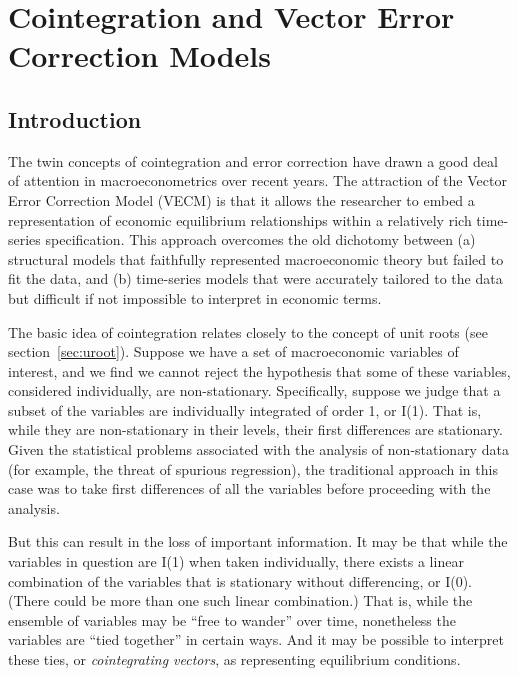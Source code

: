 \chapter{Cointegration and Vector Error Correction Models}
\label{chap:vecm}

\section{Introduction}
\label{sec:VECM-intro}

The twin concepts of cointegration and error correction have drawn a
good deal of attention in macroeconometrics over recent years.  The
attraction of the Vector Error Correction Model (VECM) is that it
allows the researcher to embed a representation of economic
equilibrium relationships within a relatively rich time-series
specification.  This approach overcomes the old dichotomy between (a)
structural models that faithfully represented macroeconomic theory but
failed to fit the data, and (b) time-series models that were
accurately tailored to the data but difficult if not impossible to
interpret in economic terms.

The basic idea of cointegration relates closely to the concept of unit
roots (see section~\ref{sec:uroot}).  Suppose we have a set of
macroeconomic variables of interest, and we find we cannot reject the
hypothesis that some of these variables, considered individually, are
non-stationary.  Specifically, suppose we judge that a subset of the
variables are individually integrated of order 1, or I(1).  That is,
while they are non-stationary in their levels, their first differences
are stationary.  Given the statistical problems associated with the
analysis of non-stationary data (for example, the threat of spurious
regression), the traditional approach in this case was to take first
differences of all the variables before proceeding with the analysis.

But this can result in the loss of important information.  It may be
that while the variables in question are I(1) when taken individually,
there exists a linear combination of the variables that is stationary
without differencing, or I(0).  (There could be more than one such
linear combination.)  That is, while the ensemble of variables may be
``free to wander'' over time, nonetheless the variables are ``tied
together'' in certain ways.  And it may be possible to interpret these
ties, or \emph{cointegrating vectors}, as representing equilibrium
conditions.

